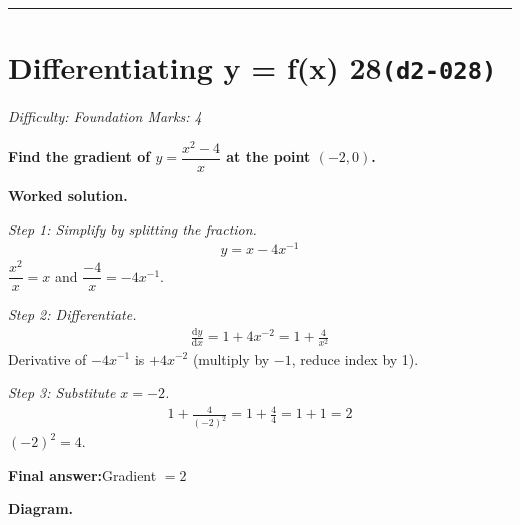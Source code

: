 \documentclass[11pt]{article}
\newcommand{\question}[1]{\par\medskip\noindent\textbf{#1}\par}
\begin{document}
\medskip\hrule

\section*{Differentiating y = f(x) 28\quad\small\texttt{(d2-028)}}
\textit{Difficulty: Foundation \quad\textbar\quad Marks: 4}

\question{Find the gradient of \( y = \dfrac{x^2 - 4}{x} \) at the point \( (-2, 0) \).}

\textbf{Worked solution.}

\textit{Step 1: Simplify by splitting the fraction.}
\[\begin{gathered}
y = x - 4x^{-1}
\end{gathered}\]
\( \dfrac{x^2}{x} = x \) and \( \dfrac{-4}{x} = -4x^{-1} \).

\textit{Step 2: Differentiate.}
\[\begin{gathered}
\frac{\mathrm{d}y}{\mathrm{d}x} = 1 + 4x^{-2} = 1 + \frac{4}{x^2}
\end{gathered}\]
Derivative of \( -4x^{-1} \) is \( +4x^{-2} \) (multiply by \(-1\), reduce index by 1).

\textit{Step 3: Substitute \( x = -2 \).}
\[\begin{gathered}
1 + \frac{4}{(-2)^2} = 1 + \frac{4}{4} = 1 + 1 = 2
\end{gathered}\]
\( (-2)^2 = 4 \).

\begin{answerbox}
\textbf{Final answer:}\quad Gradient \(\displaystyle  = 2 \)
\end{answerbox}
\textbf{Diagram.}
\end{document}
